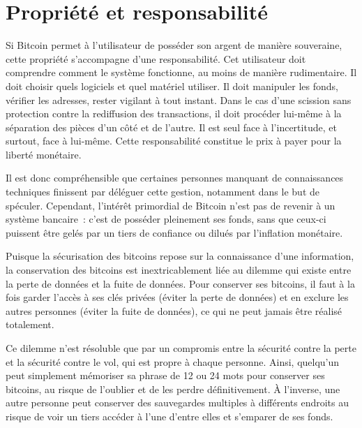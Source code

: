 \section*{Propriété et responsabilité}

Si Bitcoin permet à l'utilisateur de posséder son argent de manière souveraine, cette propriété s'accompagne d'une responsabilité. Cet utilisateur doit comprendre comment le système fonctionne, au moins de manière rudimentaire. Il doit choisir quels logiciels et quel matériel utiliser. Il doit manipuler les fonds, vérifier les adresses, rester vigilant à tout instant. Dans le cas d'une scission sans protection contre la rediffusion des transactions, il doit procéder lui-même à la séparation des pièces d'un côté et de l'autre. Il est seul face à l'incertitude, et surtout, face à lui-même. Cette responsabilité constitue le prix à payer pour la liberté monétaire.

Il est donc compréhensible que certaines personnes manquant de connaissances techniques finissent par déléguer cette gestion, notamment dans le but de spéculer. Cependant, l'intérêt primordial de Bitcoin n'est pas de revenir à un système bancaire~: c'est de posséder pleinement ses fonds, sans que ceux-ci puissent être gelés par un tiers de confiance ou dilués par l'inflation monétaire.

Puisque la sécurisation des bitcoins repose sur la connaissance d'une information, la conservation des bitcoins est inextricablement liée au dilemme qui existe entre la perte de données et la fuite de données. Pour conserver ses bitcoins, il faut à la fois garder l'accès à ses clés privées (éviter la perte de données) et en exclure les autres personnes (éviter la fuite de données), ce qui ne peut jamais être réalisé totalement.

Ce dilemme n'est résoluble que par un compromis entre la sécurité contre la perte et la sécurité contre le vol, qui est propre à chaque personne. Ainsi, quelqu'un peut simplement mémoriser sa phrase de 12 ou 24 mots pour conserver ses bitcoins, au risque de l'oublier et de les perdre définitivement. À l'inverse, une autre personne peut conserver des sauvegardes multiples à différents endroits au risque de voir un tiers accéder à l'une d'entre elles et s'emparer de ses fonds.

